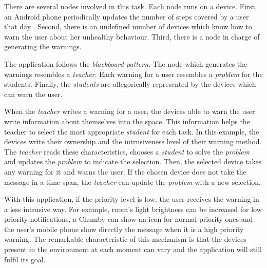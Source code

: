 There are several nodes involved in this task.
Each node runs on a device. %
First, an Android phone periodically updates the number of steps covered by a user that day .
Second, there is an undefined number of devices which know how to warn the user about her unhealthy behaviour.
Third, there is a node in charge of generating the warnings.


\medskip


The application follows the \emph{blackboard pattern}.
The node which generates the warnings resembles a \emph{teacher}.
Each warning for a user resembles a \emph{problem} for the students.
Finally, the \emph{students} are allegorically represented by the devices which can warn the user.


When the \emph{teacher} writes a warning for a user, the devices able to warn the user write information about themselves into the space.
This information helps the teacher to select the most appropriate \emph{student} for each task.
In this example, the devices write their ownership and the intrusiveness level of their warning method.
The \emph{teacher} reads these characteristics, chooses a \emph{student} to solve the \emph{problem} and updates the \emph{problem} to indicate the selection.
Then, the selected device takes any warning for it and warns the user. %
If the chosen device does not take the message in a time span, the \emph{teacher} can update the \emph{problem} with a new selection.


With this application, if the priority level is low, the user receives the warning in a less intrusive way.
For example, room's light brightness can be increased for low priority notifications, a Chumby  can show an icon for normal priority ones and the user's mobile phone show directly the message when it is a high priority warning. %
The remarkable characteristic of this mechanism is that the devices present in the environment at each moment can vary and the application will still fulfil its goal.




